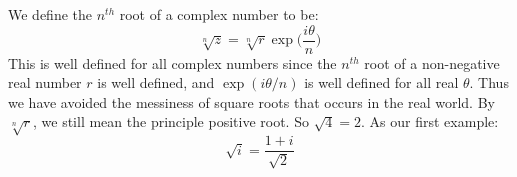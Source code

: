 \documentclass[crop=false,class=book,oneside]{standalone}
\begin{document}
            We define the $n^{th}$ root of a complex number to be:
            \begin{equation}
            \sqrt[n]{z}=
            \sqrt[n]{r}\exp\Big(\frac{i\theta}{n}\Big)
        \end{equation}
            This is well defined for all complex numbers since
            the $n^{th}$ root of a non-negative real number $r$
            is well defined, and $\exp(i\theta/n)$ is well
            defined for all real $\theta$. Thus we have avoided
            the messiness of square roots that occurs in
            the real world. By $\sqrt[n]{r}$, we still mean
            the principle positive root. So
            $\sqrt{4}=2$. As our first example:
            \begin{equation}
                \sqrt{i}=\frac{1+i}{\sqrt{2}}
            \end{equation}
\end{document}
